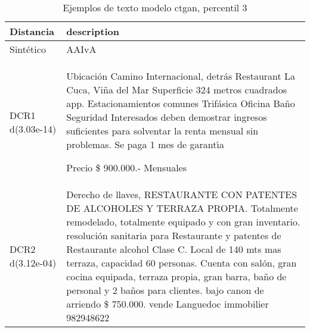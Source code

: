 \begin{table}[H]
\centering
\fontsize{10}{14}\selectfont
\caption{Ejemplos de texto modelo ctgan, percentil 3}
\label{table-example-economicos-b-3-ctgan-3p-text}
\begin{tabular}{|l|m{35em}|}
\hline
\rowcolor[gray]{0.8}
Distancia & description \\
\hline Sintético & AAIvA \\
\hline DCR1 d(3.03e-14) & Ubicaci\'on Camino Internacional, detr\'as Restaurant La Cuca, Vi\~na del Mar
Superficie 324 metros cuadrados app.
Estacionamientos comunes
Trif\'asica 
Oficina
Ba\~no
Seguridad
Interesados deben demostrar ingresos suficientes para solventar la renta mensual sin problemas. 
Se paga 1 mes de garant{\'\i}a
 
Precio \$ 900.000.- Mensuales \\
\hline DCR2 d(3.12e-04) & Derecho de llaves, RESTAURANTE CON PATENTES DE ALCOHOLES Y TERRAZA PROPIA. Totalmente remodelado, totalmente equipado y con gran inventario. resoluci\'on sanitaria para Restaurante y patentes de Restaurante alcohol Clase C. Local de 140 mts mas terraza, capacidad 60 personas. Cuenta con sal\'on, gran cocina equipada, terraza propia, gran barra, ba\~no de personal y 2 ba\~nos para clientes. bajo canon de arriendo \$ 750.000. 
vende Languedoc immobilier 982948622 \\
\hline
\end{tabular}
\end{table}
